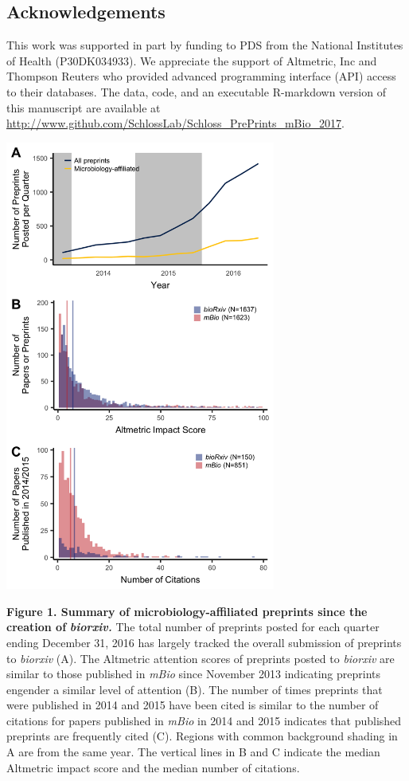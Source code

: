 \documentclass[11pt,]{article}
\begin{document}
\subsection{Acknowledgements}\label{acknowledgements}

This work was supported in part by funding to PDS from the National
Institutes of Health (P30DK034933). We appreciate the support of
Altmetric, Inc and Thompson Reuters who provided advanced programming
interface (API) access to their databases. The data, code, and an
executable R-markdown version of this manuscript are available at
\url{http://www.github.com/SchlossLab/Schloss_PrePrints_mBio_2017}.

\newpage

\includegraphics[width=3.5in]{../figures/figure1.png}

\textbf{Figure 1. Summary of microbiology-affiliated preprints since the
creation of} \textbf{\emph{biorxiv.}} The total number of preprints
posted for each quarter ending December 31, 2016 has largely tracked the
overall submission of preprints to \emph{biorxiv} (A). The Altmetric
attention scores of preprints posted to \emph{biorxiv} are similar to
those published in \emph{mBio} since November 2013 indicating preprints
engender a similar level of attention (B). The number of times preprints
that were published in 2014 and 2015 have been cited is similar to the
number of citations for papers published in \emph{mBio} in 2014 and 2015
indicates that published preprints are frequently cited (C). Regions
with common background shading in A are from the same year. The vertical
lines in B and C indicate the median Altmetric impact score and the
median number of citations.
\end{document}
